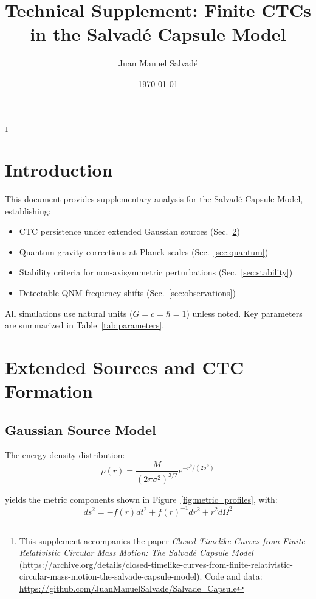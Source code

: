 \documentclass[12pt]{article}
\title{Technical Supplement: Finite CTCs in the Salvadé Capsule Model}
\author{Juan Manuel Salvadé}
\date{\today}
\begin{document}
\maketitle
\footnote{This supplement accompanies the paper \textit{Closed Timelike Curves from Finite Relativistic Circular Mass Motion: The Salvadé Capsule Model} (https://archive.org/details/closed-timelike-curves-from-finite-relativistic-circular-mass-motion-the-salvade-capsule-model). Code and data: \url{https://github.com/JuanManuelSalvade/Salvade_Capsule}}

\section{Introduction}\label{sec:intro}
This document provides supplementary analysis for the Salvadé Capsule Model, establishing:

\begin{itemize}
\item CTC persistence under extended Gaussian sources (Sec.~\ref{sec:sources})
\item Quantum gravity corrections at Planck scales (Sec.~\ref{sec:quantum})
\item Stability criteria for non-axisymmetric perturbations (Sec.~\ref{sec:stability})
\item Detectable QNM frequency shifts (Sec.~\ref{sec:observations})
\end{itemize}

All simulations use natural units ($G = c = \hbar = 1$) unless noted. Key parameters are summarized in Table~\ref{tab:parameters}.

\section{Extended Sources and CTC Formation}\label{sec:sources}

\subsection{Gaussian Source Model}\label{subsec:gaussian}
The energy density distribution:
\begin{equation}\label{eq:rho}
\rho(r) = \frac{M}{(2\pi \sigma^2)^{3/2}} e^{-r^2/(2\sigma^2)}
\end{equation}

yields the metric components shown in Figure~\ref{fig:metric_profiles}, with:
\begin{equation}\label{eq:metric}
ds^2 = -f(r)dt^2 + f(r)^{-1}dr^2 + r^2d\Omega^2
\end{equation}
\end{document}

